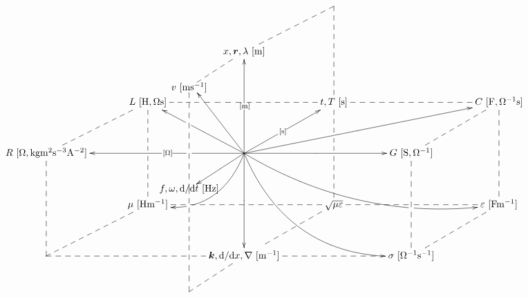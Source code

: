\documentclass[a4j,10pt]{jarticle}
\makeatletter
\def\uni#1{[\!\unit{#1}]}
\def\cell#1#2{#1\,\uni{#2}}
\def\dotted#1{\ar@{--}[#1]}
\makeatother
\begin{document}
\begin{center}
\def\cell#1#2{#1\,\unit{[#2]}}
\def\uni#1{}
\vspace{-10mm}
\def\tom{\ar@{->}[uu]|-{\unit{[m]}}}
\def\tos{\ar@{->}[ur]|-{\unit{[s]}}}
\def\toO{\ar@{->}[ll]|!{[]+(-20,-13);[]+(-20,13)}\hole|-{\unit{[O]}}}
\def\tomm{\ar[dd]|-{\uni{m^{-1}}}}
\def\toms{\ar@{->}+(-20,-13)*{\cell{f,\omega, \dd/\dd t}{Hz}}|-{\uni{s^{-1}}}}
\def\tomO{\ar[rr]|-{\uni{O^{-1}}}}
\def\arrr{\dotted{rr}}
\def\ardd{\dotted{dd}}
\def\arddsplit{\dotted{dd}|!{[ld];[rr]}\hole|!{[ld];[rd]}\hole}
\def\aruu{\dotted{uu}}
\def\arll{\dotted{ll}}
\def\arllsplit{\dotted{ll}|!{[ld];[lu]}\hole}
\def\arllsplitp{\dotted{ll}|!{[]+(-20,-13);[]+(-20,13)}\hole}
\def\arrrsplit{\dotted{rr}|!{[rd];[ru]+(-20,-13)}\hole|!{[rd];[ru]}\hole}
\def\ard{\dotted{d}}
\def\arur{\dotted{ur}}
\def\ardr{\dotted{dr}}
\def\ardl{\dotted{dl} |!{+(-8,-30);+(-8,30)}\hole}
\def\arrowzp{\ar@/^2pc/[dl]|-(0.4){\uni{Hm^{-1}}}|!{[]+(-20,-13);[]+(-20,13)}\hole}
\def\arrowzzp{\ar@/_2pc/[rrrd]|-(0.25){\uni{Fm^{-1}}}|!{[rr];[rrdd]}\hole }
\def\tolv{\ar@{--}'+(-20,-13)*{\cell{v}{m s^{-1}}}'[dd]+(-20,-13)}
\def\tov{\ar@{->}[uu]+(-20,-13)+(3,-2)}
\def\toL{\ar@{->}[ul]|-{\uni{H,Os}}|!{+(-12,-12);+(-12,12)}\hole}
\def\toC{\ar@{->}[urrr]|-{\uni{F,O^{-1}s}}}
\def\arrowyyp{\ar@/_3pc/@{->}[rrdd]|-(0.7){\uni{O^{-1}m^{-1}}}}
\def\tof{\ar@{--}'+(-20,-13)'[uu]+(-20,-13) |!{+(-10,-8);+(10,-8)}\hole}
\def\toT{\ar@{--}'[ur]'[dr]}
\[\xymatrix@=0.50in{
  &&*=0{}& *=0{} &\\
  &      & \cell{x,\bm r, \lambda}{m} \tolv \toT &      &      &      & \\
  &      \cell{L}{H,Os} \arrrsplit\arddsplit      &      & \cell{t,T}{s}\arrr\arddsplit      &      & \cell{C}{F,O^{-1}s} \ardd      &      \\
  \cell{R}{O,kg m^2 s^{-3} A^{-2}}\ardd\arur      &      & *=0{}\arrowyyp\toL\toC\tov\tom\tos\toO\tomO\tomm\toms \arrowzzp \arrowzp      &      & \cell{G}{S,\Omega^{-1}}\arur\ardd      &      & \\
  &      \cell{\mu}{Hm^{-1}}      &      & \sqrt{\mu\varepsilon}\ardl\arll      &      & \cell{\varepsilon}{Fm^{-1}} \arllsplit      &      \\
  *=0{} \arur      &      & \cell{\bm k,\dd/\dd x, \nabla}{m^{-1}} \arllsplitp\tof      &      & \cell{\sigma}{O^{-1}s^{-1}}\arll\arur      &      & \\
}\]
\end{center}
\end{document}
